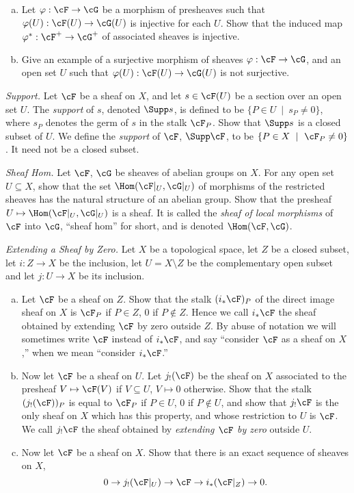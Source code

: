 \begin{homework}[e]
	$ $
	\begin{enumerate}[(a)]

		\item Let $\varphi:\cF\to \cG$ be a morphism of presheaves such that $\varphi(U):\cF(U)\to \cG(U)$ is injective for each $U$. Show that the induced map $\varphi^*:\cF^+\to \cG^+$ of associated sheaves is injective.

		\item Give an example of a surjective morphism of sheaves $\varphi:\cF\to \cG$, and an open set $U$ such that $\varphi(U):\cF(U)\to \cG(U)$ is not surjective. 
	\end{enumerate}

	 \textit{Support.} Let $\cF$ be a sheaf on $X$, and let $s \in \cF(U)$ be a section over an open set $U$. The \textit{support} of $s$, denoted $\Supp s$, is defined to be $\{P\in U ~ \mid~ s_P \neq 0\}$, where $s_P$ denotes the germ of $s$ in the stalk $\cF_P$. Show that $\Supp s$ is a closed subset of $U$. We define the \textit{support} of $\cF$, $\Supp \cF$, to be $\{P\in X~\mid~ \cF_P \neq 0\}$. It need not be a closed subset.

	\prob \textit{Sheaf Hom.} Let $\cF$, $\cG$ be sheaves of abelian groups on $X$. For any open set $U \subseteq X$, show that the set $\Hom(\cF|_U, \cG|_U)$ of morphisms of the restricted sheaves has the natural structure of an abelian group. Show that the presheaf $U \mapsto \Hom(\cF|_U, \cG|_U)$ is a sheaf. It is called the \textit{sheaf of local morphisms} of $\cF$ into $\cG$, ``sheaf hom'' for short, and is denoted $\Hom(\cF, \cG)$.

	 \textit{Extending a Sheaf by Zero.} Let $X$ be a topological space, let $Z$ be a closed subset, let $i:Z\to X$ be the inclusion, let $U = X \setminus Z$ be the complementary open subset and let $j:U\to X$ be its inclusion.
	\begin{enumerate}[(a)]
		\item Let $\cF$ be a sheaf on $Z$. Show that the stalk $(i_*\cF)_P$ of the direct image sheaf on  $X$ is $\cF_P$ if $P \in Z$, $0$ if $P \not\in Z$. Hence we call $i_* \cF$ the sheaf obtained by extending $\cF$ by zero outside $Z$. By abuse of notation we will sometimes write $\cF$ instead of $i_*\cF$, and say ``consider $\cF$ as a sheaf on $X$,'' when we mean ``consider $i_*\cF$.''
		\item Now let $\cF$ be a sheaf on $U$. Let $j_!(\cF)$ be the sheaf on $X$ associated to the presheaf $V\mapsto \cF(V)$ if $V \subseteq U$, $V \mapsto 0$ otherwise. Show that the stalk $(j_!(\cF))_P$ is equal to $\cF_P$ if $P \in U$, 0 if $P \not\in U$, and show that $j_!\cF$ is the only sheaf on $X$ which has this property, and whose restriction to $U$ is $\cF$. We call $j_!\cF$ the sheaf obtained by \textit{extending $\cF$ by zero} outside $U$. 
		\item Now let  $\cF$ be a sheaf on $X$. Show that there is an exact sequence of sheaves on $X$,
			\[
			0 \to j_!(\cF|_U) \to \cF \to i_*(\cF|_Z) \to 0.
			\]
	\end{enumerate}


\end{homework}
